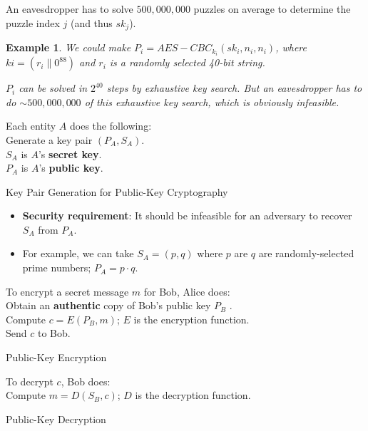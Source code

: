\documentclass[12pt,titlepage]{article}
\newtheorem{protoexample}[prototheorem]{Example}
\newenvironment{example}
{\colorlet{shadecolor}{red!15}\begin{shaded}\begin{protoexample}\normalfont}{\end{protoexample}\end{shaded}}
\begin{document}
An eavesdropper has to solve $500,000,000$ puzzles on average to determine the puzzle index $j$ (and thus $sk_j$).

\begin{example}
	We could make $P_i = AES-CBC_{k_i} (sk_i , n_i , n_i )$, where $k i = (r_i \| 0^{88})$ and $r_i$ is a randomly selected 40-bit string.

	$P_i$ can be solved in $2^{40}$ steps by exhaustive key search. But an eavesdropper has to do $\sim 500,000,000$ of this exhaustive key search, which is obviously infeasible. 
\end{example}

\begin{algorithm}
	Each entity $A$ does the following:\\
	Generate a key pair $(P_A , S_A)$.\\
	$S_A$ is $A$’s \textbf{secret key}.\\
	$P_A$ is $A$’s \textbf{public key}.
	\caption{Key Pair Generation for Public-Key Cryptography}
\end{algorithm}

\begin{itemize}
	\item \textbf{Security requirement}: It should be infeasible for an adversary to recover $S_A$ from $P_A$.
	\item For example, we can take $S_A = (p, q)$ where $p$ are $q$ are randomly-selected prime numbers; $P_A = p \cdot q$.
\end{itemize}

\begin{algorithm}
	To encrypt a secret message $m$ for Bob, Alice does:\\
	Obtain an \textbf{authentic} copy of Bob’s public key $P_B$ .\\
	Compute $c = E(P_B , m)$; $E$ is the encryption function.\\
	Send $c$ to Bob.
	\caption{Public-Key Encryption}
\end{algorithm}

\begin{algorithm}
	To decrypt $c$, Bob does:\\
	Compute $m = D(S_B , c)$; $D$ is the decryption function.
	\caption{Public-Key Decryption}
\end{algorithm}
\end{document}
